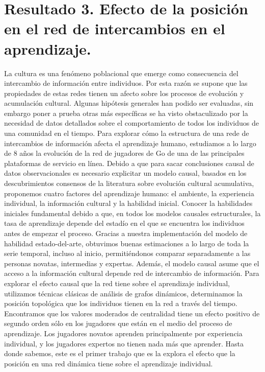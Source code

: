 \documentclass[a4paper,11pt]{book}
\theoremstyle{definition}
\begin{document}
\chapter{Resultado 3. Efecto de la posici\'on en el red de intercambios en el aprendizaje.}\label{ch:topo}

La cultura es una fenómeno poblacional que emerge como consecuencia del intercambio de información entre individuos.
%
Por esta razón se supone que las propiedades de estas redes tienen un afecto sobre los procesos de evolución y acumulación cultural.%
%
Algunas hipótesis generales han podido ser evaluadas, sin embargo poner a prueba otras más específicas se ha visto obstaculizado por la necesidad de datos detallados sobre el comportamiento de todos los individuos de una comunidad en el tiempo.
%
Para explorar cómo la estructura de una rede de intercambios de información afecta el aprendizaje humano, estudiamos a lo largo de 8 años la evolución de la red de jugadores de Go de una de las principales plataformas de servicio en línea.
%
Debido a que para sacar conclusiones causal de datos observacionales es necesario explicitar un modelo causal, basados en los descubrimientos consensos de la literatura sobre evolución cultural acumulativa, proponemos cuatro factores del aprendizaje humano: el ambiente, la experiencia individual, la información cultural y la habilidad inicial.
%
Conocer la habilidades iniciales fundamental debido a que, en todos los modelos causales estructurales, la tasa de aprendizaje depende del estadío en el que se encuentra los individuos antes de empezar el proceso.
%
Gracias a nuestra implementación del modelo de habilidad estado-del-arte, obtuvimos buenas estimaciones a lo largo de toda la serie temporal, incluso al inicio, permitiéndonos comparar separadamente a las personas novatas, intermedias y expertas.
%
Además, el modelo causal asume que el acceso a la información cultural depende red de intercambio de información.
%
Para explorar el efecto causal que la red tiene sobre el aprendizaje individual, utilizamos técnicas clásicas de análisis de grafos dinámicos, determinamos la posición topológica que los individuos tienen en la red a través del tiempo.
%
Encontramos que los valores moderados de centralidad tiene un efecto positivo de segundo orden sólo en los jugadores que están en el medio del proceso de aprendizaje.
%
Los jugadores novatos aprenden principalmente por experiencia individual, y los jugadores expertos no tienen nada más que aprender.
%
Hasta donde sabemos, este es el primer trabajo que es la explora el efecto que la posición en una red dinámica tiene sobre el aprendizaje individual.
\end{document}
